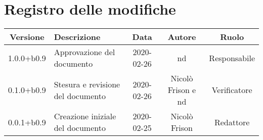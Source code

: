 \section*{Registro delle modifiche}

\begin{center}
	\begin{longtable}{|c|p{3cm}|c|c|c|}
	\hline
	\rowcolor{lighter-grayer}
	\textbf{Versione} & \textbf{Descrizione} & \textbf{Data} & \textbf{Autore} & \textbf{Ruolo} \\
	\hline
	\endfirsthead


	1.0.0+b0.9 & Approvazione del documento & 2020-02-26 & nd & Responsabile \\
	\hline
	0.1.0+b0.9 & Stesura e revisione del documento & 2020-02-26 & Nicolò Frison e nd & Verificatore \\
	\hline
	0.0.1+b0.9 & Creazione iniziale del documento & 2020-02-25 & Nicolò Frison & Redattore \\
	\hline

	\end{longtable}
\end{center}